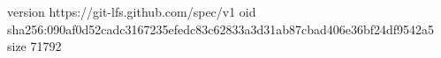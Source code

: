 version https://git-lfs.github.com/spec/v1
oid sha256:090af0d52cadc3167235efedc83c62833a3d31ab87cbad406e36bf24df9542a5
size 71792
